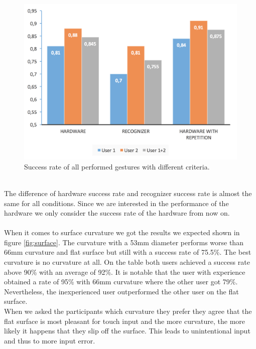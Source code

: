 \begin{figure}
\includegraphics[scale=0.16]{images/overallRecognition.jpg}
\caption{Success rate of all performed gestures with different criteria.}
\label{fig:overallRecognition}
\end{figure}
\\
The difference of hardware success rate and recognizer success rate is almost the same for all conditions. Since we are interested in the performance of the hardware we only consider the success rate of the hardware from now on. \\ \\
When it comes to surface curvature we got the results we expected shown in figure \ref{fig:surface}. The curvature with a 53mm diameter performs worse than 66mm curvature and flat surface but still with a success rate of 75.5\%. The best curvature is no curvature at all. On the table both users achieved a success rate above 90\% with an average of 92\%. It is notable that the user with experience obtained a rate of 95\% with 66mm curvature where the other user got 79\%. Nevertheless, the inexperienced user outperformed the other user on the flat surface. 
\\
When we asked the participants which curvature they prefer they agree that the flat surface is most pleasant for touch input and the more curvature, the more likely it happens that they slip off the surface. This leads to unintentional input and thus to more input error. 
